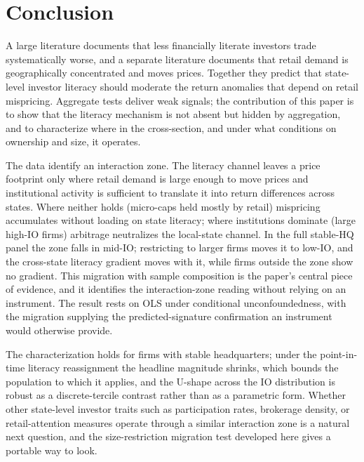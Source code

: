 \section{Conclusion}
\label{sec:conclusion}

A large literature documents that less financially literate investors trade systematically worse, and a separate literature documents that retail demand is geographically concentrated and moves prices. Together they predict that state-level investor literacy should moderate the return anomalies that depend on retail mispricing. Aggregate tests deliver weak signals; the contribution of this paper is to show that the literacy mechanism is not absent but hidden by aggregation, and to characterize where in the cross-section, and under what conditions on ownership and size, it operates.

The data identify an interaction zone. The literacy channel leaves a price footprint only where retail demand is large enough to move prices and institutional activity is sufficient to translate it into return differences across states. Where neither holds (micro-caps held mostly by retail) mispricing accumulates without loading on state literacy; where institutions dominate (large high-IO firms) arbitrage neutralizes the local-state channel. In the full stable-HQ panel the zone falls in mid-IO; restricting to larger firms moves it to low-IO, and the cross-state literacy gradient moves with it, while firms outside the zone show no gradient. This migration with sample composition is the paper's central piece of evidence, and it identifies the interaction-zone reading without relying on an instrument. The result rests on OLS under conditional unconfoundedness, with the migration supplying the predicted-signature confirmation an instrument would otherwise provide.

The characterization holds for firms with stable headquarters; under the point-in-time literacy reassignment the headline magnitude shrinks, which bounds the population to which it applies, and the U-shape across the IO distribution is robust as a discrete-tercile contrast rather than as a parametric form. Whether other state-level investor traits such as participation rates, brokerage density, or retail-attention measures operate through a similar interaction zone is a natural next question, and the size-restriction migration test developed here gives a portable way to look.
